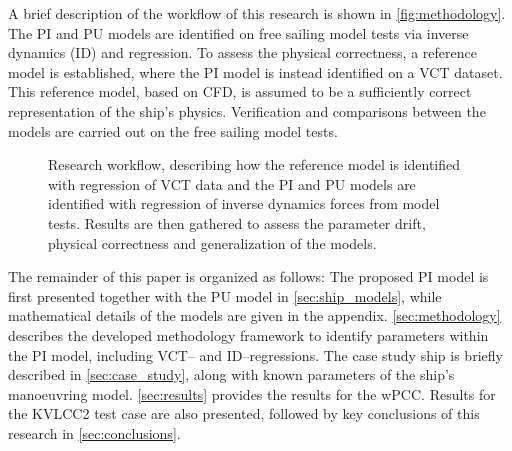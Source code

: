 A brief description of the workflow of this research is shown in \autoref{fig:methodology}.
The PI and PU models are identified on free sailing model tests \citep{alexandersson_system_2022,alexandersson_wpcc_2024} via inverse dynamics (ID) and regression. To assess the physical correctness, a reference model is established, where the PI model is instead identified on a VCT dataset. This reference model, based on CFD, is assumed to be a sufficiently correct representation of the ship's physics.
Verification and comparisons between the models are carried out on the free sailing model tests.
%
\begin{figure}[h]
  \centering
  
  \caption{Research workflow, describing how the reference model is identified with regression of VCT data and the PI and PU models are identified with regression of inverse dynamics forces from model tests. Results are then gathered to assess the parameter drift, physical correctness and generalization of the models.}
  \label{fig:methodology}
\end{figure}

The remainder of this paper is organized as follows: The proposed PI model is first presented together with the PU 
 model in \autoref{sec:ship_models}, while mathematical details of the models are given in the appendix. 
\autoref{sec:methodology} describes the developed methodology framework to identify parameters within the PI model, including VCT-- and ID--regressions. The case study ship is briefly described in \autoref{sec:case_study}, along with known parameters of the ship’s manoeuvring model. \autoref{sec:results} provides the results for the wPCC. Results for the KVLCC2 test case are also presented, followed by key conclusions of this research in \autoref{sec:conclusions}.